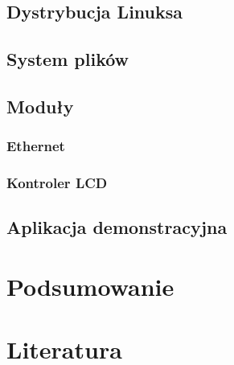 \documentclass[a4paper]{report}
\begin{document}
		\section{Dystrybucja Linuksa}
		\section{System plików}
		\section{Moduły}
			\subsection{Ethernet}
			\subsection{Kontroler LCD}
		\section{Aplikacja demonstracyjna}
		
	\chapter{Podsumowanie}
	\chapter{Literatura}
\end{document}
